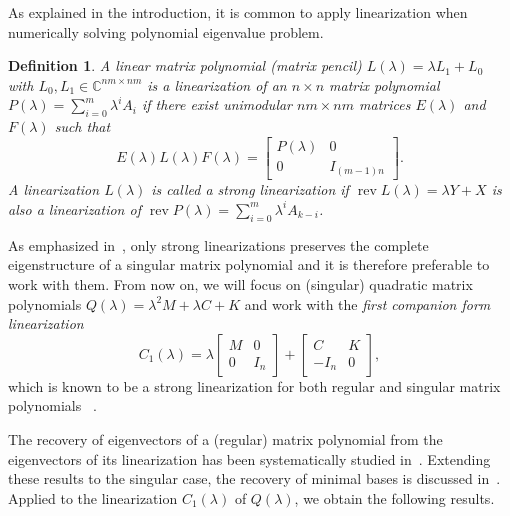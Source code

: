 \documentclass[12pt]{article}
\DeclareMathOperator{\diag}{diag}
\DeclareMathOperator{\rev}{rev}
\newtheorem{definition}[theorem]{Definition}
\begin{document}
As explained in the introduction, it is common to apply linearization when numerically solving polynomial eigenvalue problem.
\begin{definition}
A linear matrix polynomial (matrix pencil) $L(\lambda) = \lambda L_1 + L_0$ with $L_0,L_1 \in\mathbb{C}^{nm\times nm}$ is a \emph{linearization} of an $n\times n$ matrix polynomial $P(\lambda) = \sum^m_{i=0}\lambda^iA_i$ if there exist unimodular $nm\times nm$ matrices $E(\lambda)$ and $F(\lambda)$ such that
\[
    E(\lambda)L(\lambda)F(\lambda) = \begin{bmatrix}
    P(\lambda) & 0\\
    0 & I_{(m-1)n}
    \end{bmatrix}.
\]
A linearization $L(\lambda)$ is called a \emph{strong linearization} if $\rev L(\lambda) = \lambda Y + X$ is also a linearization of $\rev P(\lambda) = \sum^m_{i=0}\lambda^iA_{k-i}$.
\end{definition}
As emphasized in~\cite{de2009linearizations}, %
only strong linearizations preserves the complete eigenstructure of a singular matrix polynomial
and it is therefore preferable to work with them.
From now on, we will focus on (singular) quadratic matrix polynomials
$Q(\lambda) = \lambda^2M + \lambda C + K$ and work with
the \emph{first companion form linearization}
\begin{equation}\label{eq:c1}
    C_1(\lambda) = \lambda \begin{bmatrix} M & 0\\ 0 & I_n \end{bmatrix} + \begin{bmatrix} C & K\\ -I_n & 0 \end{bmatrix},
\end{equation}
which is known to be a strong linearization for both regular and singular matrix polynomials~ \cite{gohberg1988general,de2009linearizations}.

The recovery of eigenvectors of a (regular) matrix polynomial from the eigenvectors of its linearization has been systematically studied in~\cite{mackey2006vector}. Extending these results to the singular case, the recovery of minimal bases is discussed in~\cite{de2009linearizations}. Applied to the linearization $C_1(\lambda)$ of $Q(\lambda)$, we obtain the following results.
\end{document}
